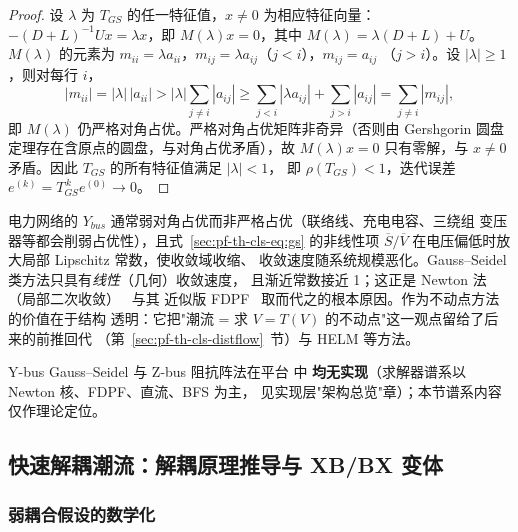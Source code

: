 \begin{proof}
设 $\lambda$ 为 $T_{GS}$ 的任一特征值，$x\ne0$ 为相应特征向量：
$-(D+L)^{-1}Ux=\lambda x$，即 $M(\lambda)x=0$，其中
$M(\lambda)=\lambda(D+L)+U$。$M(\lambda)$ 的元素为
$m_{ii}=\lambda a_{ii}$，$m_{ij}=\lambda a_{ij}$（$j<i$），$m_{ij}=a_{ij}$
（$j>i$）。设 $|\lambda|\ge1$，则对每行 $i$，
\begin{equation*}
|m_{ii}|=|\lambda|\,|a_{ii}|>|\lambda|\sum_{j\ne i}|a_{ij}|
\ge \sum_{j<i}|\lambda a_{ij}|+\sum_{j>i}|a_{ij}|=\sum_{j\ne i}|m_{ij}|,
\end{equation*}
即 $M(\lambda)$ 仍严格对角占优。严格对角占优矩阵非奇异（否则由
Gershgorin 圆盘定理存在含原点的圆盘，与对角占优矛盾），故 $M(\lambda)x=0$
只有零解，与 $x\ne0$ 矛盾。因此 $T_{GS}$ 的所有特征值满足 $|\lambda|<1$，
即 $\rho(T_{GS})<1$，迭代误差 $e^{(k)}=T_{GS}^{\,k}e^{(0)}\to0$。
\end{proof}

\begin{remark}[从线性骨架到非线性潮流]\label{sec:pf-th-cls-rem-gslim}
电力网络的 $Y_{bus}$ 通常弱对角占优而非严格占优（联络线、充电电容、三绕组
变压器等都会削弱占优性），且式~\eqref{sec:pf-th-cls-eq:gs} 的非线性项
$\overline{S}/\overline{V}$ 在电压偏低时放大局部 Lipschitz 常数，使收敛域收缩、
收敛速度随系统规模恶化。Gauss--Seidel 类方法只具有\emph{线性}（几何）收敛速度，
且渐近常数接近 1；这正是 Newton 法（局部二次收敛）~\cite{cls:tinney} 与其
近似版 FDPF~\cite{cls:stott} 取而代之的根本原因。作为不动点方法的价值在于结构
透明：它把"潮流 = 求 $V=T(V)$ 的不动点"这一观点留给了后来的前推回代
（第~\ref{sec:pf-th-cls-distflow}~节）与 HELM 等方法。
\end{remark}

\begin{gapnote}
Y-bus Gauss--Seidel 与 Z-bus 阻抗阵法在平台  中
\textbf{均无实现}（求解器谱系以 Newton 核、FDPF、直流、BFS 为主，
见实现层"架构总览"章）；本节谱系内容仅作理论定位。
\end{gapnote}

\subsection{快速解耦潮流：解耦原理推导与 XB/BX 变体}\label{sec:pf-th-cls-fdpf}

\subsubsection{弱耦合假设的数学化}

